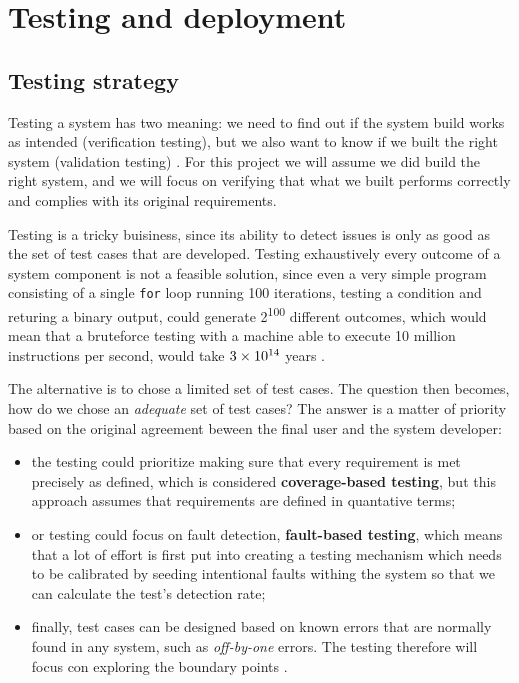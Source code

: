 \chapter{Testing and deployment}

\section{Testing strategy}
Testing a system has two meaning: we need to find out if the system build works
as intended (verification testing), but we also want to know if we built the
right system (validation testing) \cite{VV08}. For this project we will assume
we did build the right system, and we will focus on verifying that what we built
performs correctly and complies with its original requirements.

Testing is a tricky buisiness, since its ability to detect issues is only as
good as the set of test cases that are developed. Testing exhaustively every
outcome of a system component is not a feasible solution, since even a very
simple program consisting of a single \texttt{for} loop running 100 iterations,
testing a condition and returing a binary output, could generate
2\textsuperscript{100} different outcomes, which would mean that a bruteforce
testing with a machine able to execute 10 million instructions per second, would
take $3 \times 10\textsuperscript{14}$ years \cite{VV08}.

The alternative is to chose a limited set of test cases. The question then
becomes, how do we chose an \emph{adequate} set of test cases? The answer is a
matter of priority based on the original agreement beween the final user and the
system developer:
\begin{itemize}
  \item the testing could prioritize making sure that every requirement is met
  precisely as defined, which is considered \textbf{coverage-based testing}, but
  this approach assumes that requirements are defined in quantative terms;
  \item or testing could focus on fault detection, \textbf{fault-based testing},
  which means that a lot of effort is first put into creating a testing
  mechanism which needs to be calibrated by seeding intentional faults withing
  the system so that we can calculate the test's detection rate;
  \item finally, test cases can be designed based on known errors
  that are normally found in any system, such as \emph{off-by-one} errors. The
  testing therefore will focus con exploring the boundary points \cite{VV08}.
\end{itemize}

